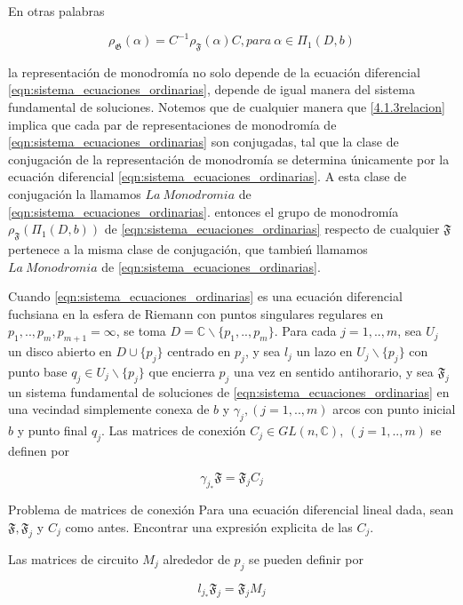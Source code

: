 En otras palabras

\begin{equation} \label{4.1.3relacion}
\rho_{\mathfrak{G}}(\alpha)=C^{-1} \rho_{\mathfrak{F}}(\alpha) C, para \ \alpha \in \Pi_{1} (D,b)
\end{equation}

la representaci\'on de monodrom\'ia no solo depende de la ecuaci\'on diferencial \ref{eqn:sistema_ecuaciones_ordinarias}, depende de igual manera del sistema fundamental de soluciones. Notemos que de cualquier manera que \ref{4.1.3relacion} implica que cada par de representaciones de monodrom\'ia de \ref{eqn:sistema_ecuaciones_ordinarias} son conjugadas, tal que la clase de conjugaci\'on de la representaci\'on de monodrom\'ia se determina \'unicamente por la ecuaci\'on diferencial \ref{eqn:sistema_ecuaciones_ordinarias}. A esta clase de conjugaci\'on la llamamos $La \ Monodromia$ de \ref{eqn:sistema_ecuaciones_ordinarias}. entonces el grupo de monodrom\'ia $\rho_{\mathfrak{F}} (\Pi_{1} (D,b))$ de \ref{eqn:sistema_ecuaciones_ordinarias} respecto de cualquier $\mathfrak{F} $ pertenece a la misma clase de conjugaci\'on, que tambie\'n llamamos $La \ Monodromia$ de \ref{eqn:sistema_ecuaciones_ordinarias}.


Cuando \ref{eqn:sistema_ecuaciones_ordinarias} es una ecuaci\'on diferencial fuchsiana en la esfera de Riemann con puntos singulares regulares en $p_{1},..,p_{m},p_{m+1} = \infty$, se toma $D= \mathbb{C} \backslash \lbrace p_{1},..,p_{m} \rbrace$. Para cada $j=1,..,m$, sea $U_{j}$ un disco abierto en $D \cup \lbrace p_{j}\rbrace$ centrado en $p_{j}$, y sea $\textit{l} _{j}$ un lazo en $U_{j} \backslash \lbrace p_{j} \rbrace$ con punto base $q_{j} \in U_{j} \backslash \lbrace p_{j} \rbrace$ que encierra $p_{j} $ una vez en sentido antihorario, y sea $\mathfrak{F}_{j}$ un sistema fundamental de soluciones de \ref{eqn:sistema_ecuaciones_ordinarias}  en una vecindad simplemente conexa de $b$ y $\gamma_{j}, (j=1,..,m)$  arcos con punto inicial $b$ y punto final $q_{j}$. Las matrices de conexi\'on $C_{j} \in  GL(n, \mathbb{C}), \ (j=1,..,m)$ se definen por

\begin{equation}\label{eqn:matcon1}
  \gamma_{j_{*}} \mathfrak{F} = \mathfrak{F}_{j} C_{j}
\end{equation}

\begin{prob}{Problema de matrices de conexi\'on} Para una ecuaci\'on diferencial lineal dada, sean $\mathfrak{F}, \mathfrak{F}_{j}$ y $C_{j}$ como antes. Encontrar una expresi\'on explicita de las $C_{j}$.

Las matrices de circuito $M_{j}$ alrededor de $p_{j}$ se pueden definir por

\begin{equation}\label{eqn:matcon2}
 \textit{l} _{j_{*}} \mathfrak{F}_{j} = \mathfrak{F}_{j} M_{j}
\end{equation}

\end{prob}

